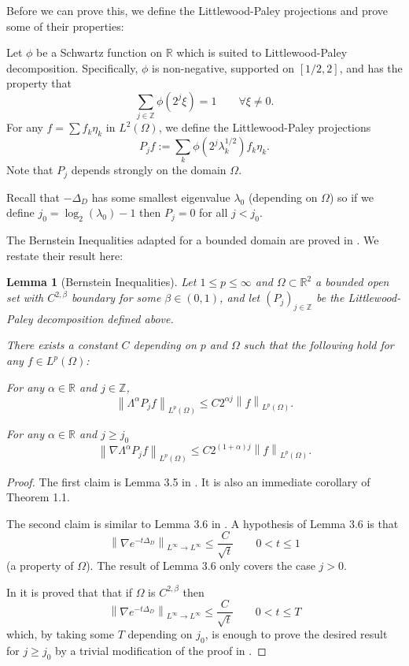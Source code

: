 \documentclass[11pt]{amsart}
\newtheorem{lemma}[theorem]{Lemma}
\theoremstyle{remark}
\theoremstyle{definition}
\newcommand{\R}{\mathbb{R}}
\newcommand{\Z}{\mathbb{Z}}
\newcommand{\norm}[1]{\left\lVert#1\right\rVert}
\newcommand{\grad}{\nabla}
\newcommand{\Laplace}{\Delta}
\newcommand{\eigen}[1]{\eta_{#1}} %
\begin{document}
Before we can prove this, we define the Littlewood-Paley projections and prove some of their properties:

Let $\phi$ be a Schwartz function on $\R$ which is suited to Littlewood-Paley decomposition.  Specifically, $\phi$ is non-negative, supported on $[1/2,2]$, and has the property that
\[ \sum_{j \in \Z} \phi(2^j \xi) = 1 \qquad \forall \xi \neq 0. \]
For any $f = \sum f_k \eigen{k}$ in $L^2(\Omega)$, we define the Littlewood-Paley projections
\[ P_j f := \sum_k \phi(2^j \lambda_k^{1/2}) f_k \eigen{k}. \]
Note that $P_j$ depends strongly on the domain $\Omega$.  

Recall that $-\Laplace_D$ has some smallest eigenvalue $\lambda_0$ (depending on $\Omega$) so if we define $j_0 = \log_2(\lambda_0)-1$ then $P_j = 0$ for all $j < j_0$.

The Bernstein Inequalities adapted for a bounded domain are proved in \cite{IMT.bilinear}.  We restate their result here:
\begin{lemma}[Bernstein Inequalities] \label{thm:IMT stuff}
Let $1 \leq p \leq \infty$ and $\Omega \subset \R^2$ a bounded open set with $C^{2,\beta}$ boundary for some $\beta \in (0,1)$, and let $(P_j)_{j \in \Z}$ be the Littlewood-Paley decomposition defined above.  

There exists a constant $C$ depending on $p$ and $\Omega$ such that the following hold for any $f \in L^p(\Omega)$:

For any $\alpha \in \R$ and $j \in \Z$, 
\[ \norm{\Lambda^\alpha P_j f}_{L^p(\Omega)} \leq C 2^{\alpha j} \norm{f}_{L^p(\Omega)}. \]

For any $\alpha \in \R$ and $j \geq j_0$
\[ \norm{\grad \Lambda^\alpha P_j f}_{L^p(\Omega)} \leq C 2^{(1+\alpha) j} \norm{f}_{L^p(\Omega)}. \]
\end{lemma}

\begin{proof}
The first claim is Lemma 3.5 in \cite{IMT.bilinear}.  It is also an immediate corollary of \cite{IMT.schrodinger} Theorem 1.1.  

The second claim is similar to Lemma 3.6 in \cite{IMT.bilinear}.  A hypothesis of Lemma 3.6 is that
\[ \norm{\grad e^{-t\Laplace_D}}_{L^\infty \to L^\infty} \leq \frac{C}{\sqrt{t}} \qquad 0 < t \leq 1 \]
(a property of $\Omega$).  The result of Lemma 3.6 only covers the case $j > 0$.  

In \cite{FMP} it is proved that that if $\Omega$ is $C^{2,\beta}$ then
\[ \norm{\grad e^{-t\Laplace_D}}_{L^\infty \to L^\infty} \leq \frac{C}{\sqrt{t}} \qquad 0 < t \leq T \]
which, by taking some $T$ depending on $j_0$, is enough to prove the desired result for $j \geq j_0$ by a trivial modification of the proof in \cite{IMT.bilinear}.  
\end{proof}
\end{document}
